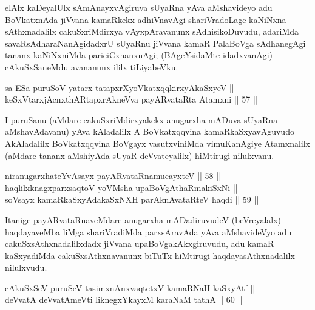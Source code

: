 \begin{artha}
elAlx kaDeyalUlx sAmAnayxvAgiruva sUyaRna yAva aMshavideyo
adu BoVkatxnAda jiVvana kamaRkekx adhiVnavAgi shariVradoLage kaNiNxna
sAthxnadalilx cakuSxriMdirxya vAyxpAravanunx sAdhisikoDuvudu, adariMda
savaRsAdharaNanAgidadxrU sUyaRnu jiVvana kamaR PalaBoVga sAdhanegAgi
tananx kaNiNxniMda pariciCxnanxnAgi; (BAgeYsidaMte idadxvanAgi)
cAkuSxSaneMdu avananunx ililx tiLiyabeVku.
\end{artha}


\begin{shl}
sa ESa puruSoV yatarx tatapxrXyoVkatxqqkirxyAkaSxyeV || \\
keSxVtarxjAcnxthARtapxrAkneVva payARvataRta Atamxni \hfill || 57 ||  
\end{shl}

\begin{artha}
I puruSanu (aMdare cakuSxriMdirxyakekx anugarxha mADuva sUyaRna aMshavAdavanu)
yAva kAladalilx A BoVkatxqqvina kamaRkaSxyavAguvudo
AkAladalilx BoVkatxqqvina BoVgayx vasutxviniMda vimuKanAgiye
Atamxnalilx (aMdare tananx aMshiyAda sUyaR deVvateyalilx) hiMtirugi
nilulxvanu.
\end{artha}


\begin{shl}
niranugarxhateYvAsayx payARvataRnamucayxteV \hfill || 58 ||  \\
haqlilxknagxparxsaqtoV yoVM\s sha upaBoVgAthaRmakiSxNi || \\
soV\s sayx kamaRkaSxyAdakaSxNXH parAknAvataRteV haqdi \hfill || 59 ||  
\end{shl}

\begin{artha}
Itanige payARvataRnaveMdare anugarxha mADadiruvudeV (beVreyalalx)
haqdayaveMba liMga shariVradiMda parxsAravAda yAva aMshavideVyo adu
cakuSxsAthxnadalilxdadx jiVvana upaBoVgakAkxgiruvudu, adu kamaR kaSxyadiMda
cakuSxsAthxnavanunx biTuTx hiMtirugi haqdayasAthxnadalilx nilulxvudu.
\end{artha}


\begin{shl}
cAkuSxSeV puruSeV tasimxnAnxvaqtetxV kamaRNaH kaSxyAtf || \\
deVvatA deVvatAmeVti liknegxYkayxM karaNaM tathA \hfill || 60 ||  
\end{shl}

